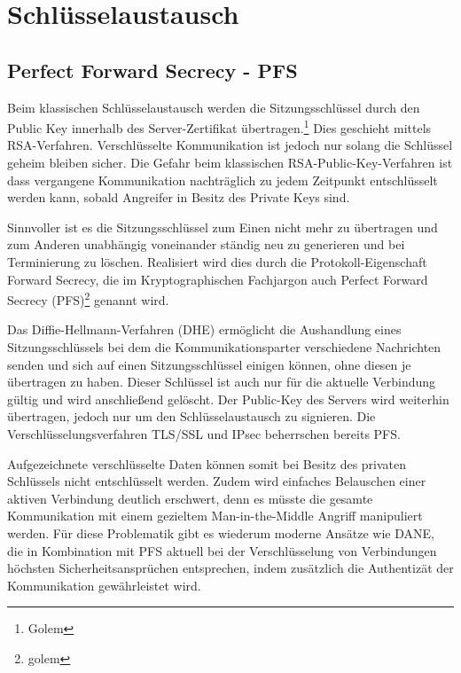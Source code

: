 \chapter{Schlüsselaustausch}

\section{Perfect Forward Secrecy - PFS}
Beim klassischen Schlüsselaustausch werden die Sitzungsschlüssel durch den Public Key innerhalb des Server-Zertifikat übertragen.\footnote{Golem} Dies geschieht mittels RSA-Verfahren. Verschlüsselte Kommunikation ist jedoch nur solang die Schlüssel geheim bleiben sicher. Die Gefahr beim klassischen RSA-Public-Key-Verfahren ist dass vergangene Kommunikation nachträglich zu jedem Zeitpunkt entschlüsselt werden kann, sobald Angreifer in Besitz des Private Keys sind. 

Sinnvoller ist es die Sitzungsschlüssel %
zum Einen nicht mehr zu übertragen und zum Anderen unabhängig voneinander ständig neu zu generieren und bei Terminierung zu löschen. 
Realisiert wird dies durch die Protokoll-Eigenschaft Forward Secrecy, die im Kryptographischen Fachjargon auch Perfect Forward Secrecy (PFS)\footnote{golem} genannt wird.

Das Diffie-Hellmann-Verfahren (DHE) ermöglicht die Aushandlung eines Sitzungsschlüssels bei dem die Kommunikationsparter verschiedene Nachrichten senden und sich auf einen Sitzungsschlüssel einigen können, ohne diesen je übertragen zu haben. Dieser Schlüssel ist auch nur für die aktuelle Verbindung gültig und wird anschließend gelöscht. Der Public-Key des Servers wird weiterhin übertragen, jedoch nur um den Schlüsselaustausch zu signieren. Die Verschlüsselungsverfahren TLS/SSL und IPsec beherrschen bereits PFS.

Aufgezeichnete verschlüsselte Daten können somit bei Besitz des privaten Schlüssels nicht entschlüsselt werden. Zudem wird einfaches Belauschen einer aktiven Verbindung deutlich erschwert, denn es müsste die gesamte Kommunikation mit einem gezieltem Man-in-the-Middle Angriff manipuliert werden. Für diese Problematik gibt es wiederum moderne Ansätze wie DANE, die in Kombination mit PFS aktuell bei der Verschlüsselung von Verbindungen höchsten Sicherheitsansprüchen entsprechen, indem zusätzlich die Authentizät der Kommunikation gewährleistet wird. %

